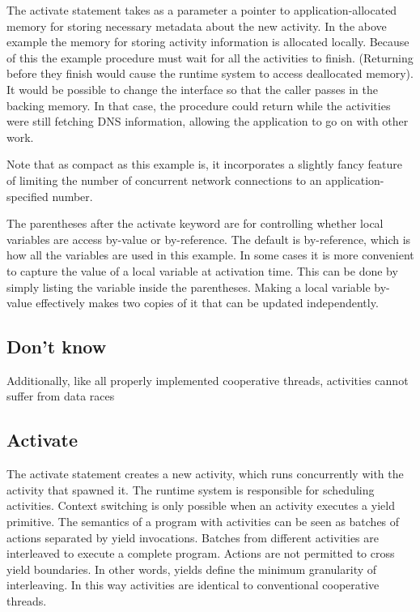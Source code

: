 \documentclass[10pt,preprint]{sigplanconf}
\begin{document}
The activate statement takes as a parameter a pointer to application-allocated memory for storing necessary metadata about the new activity.
In the above example the memory for storing activity information is allocated locally.
Because of this the example procedure must wait for all the activities to finish.
(Returning before they finish would cause the runtime system to access deallocated memory).
It would be possible to change the interface so that the caller passes in the backing memory.
In that case, the procedure could return while the activities were still fetching DNS information, allowing the application to go on with other work.

Note that as compact as this example is, it incorporates a slightly fancy feature of limiting the number of concurrent network connections to an application-specified number.

The parentheses after the activate keyword are for controlling whether local variables are access by-value or by-reference.
The default is by-reference, which is how all the variables are used in this example.
In some cases it is more convenient to capture the value of a local variable at activation time.
This can be done by simply listing the variable inside the parentheses.
Making a local variable by-value effectively makes two copies of it that can be updated independently.

\subsection{Don't know}

Additionally, like all properly implemented cooperative threads, activities cannot suffer from data races

\cite{Boehm2011}

\subsection{Activate}

The activate statement creates a new activity, which runs concurrently with the activity that spawned it.
The runtime system is responsible for scheduling activities.
Context switching is only possible when an activity executes a yield primitive.
The semantics of a program with activities can be seen as batches of actions separated by yield invocations.
Batches from different activities are interleaved to execute a complete program.
Actions are not permitted to cross yield boundaries.
In other words, yields define the minimum granularity of interleaving.
In this way activities are identical to conventional cooperative threads.
\end{document}
